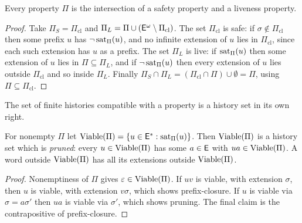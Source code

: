 \begin{established}[Decomposition]\label{thm:alpern-schneider}
Every property $\Pi$ is the intersection of a safety property and a liveness property.
\end{established}
\begin{proof}
Take $\Pi_S=\Pi_{\mathrm{cl}}$ and $\Pi_L=\Pi\cup(\mathsf{E}^{\omega}\setminus\Pi_{\mathrm{cl}})$. The set $\Pi_{\mathrm{cl}}$ is safe: if $\sigma\notin\Pi_{\mathrm{cl}}$ then some prefix $u$ has $\neg\operatorname{sat}_\Pi(u)$, and no infinite extension of $u$ lies in $\Pi_{\mathrm{cl}}$, since each such extension has $u$ as a prefix. The set $\Pi_L$ is live: if $\operatorname{sat}_\Pi(u)$ then some extension of $u$ lies in $\Pi\subseteq\Pi_L$, and if $\neg\operatorname{sat}_\Pi(u)$ then every extension of $u$ lies outside $\Pi_{\mathrm{cl}}$ and so inside $\Pi_L$. Finally $\Pi_S\cap\Pi_L=(\Pi_{\mathrm{cl}}\cap\Pi)\cup\emptyset=\Pi$, using $\Pi\subseteq\Pi_{\mathrm{cl}}$.
\end{proof}

The set of finite histories compatible with a property is a history set in its own right.

\begin{established}\label{prop:viable}
For nonempty $\Pi$ let $\operatorname{Viable}(\Pi)=\{u\in\mathsf{E}^{*}:\operatorname{sat}_\Pi(u)\}$. Then $\operatorname{Viable}(\Pi)$ is a history set which is \emph{pruned}: every $u\in\operatorname{Viable}(\Pi)$ has some $a\in\mathsf{E}$ with $ua\in\operatorname{Viable}(\Pi)$. A word outside $\operatorname{Viable}(\Pi)$ has all its extensions outside $\operatorname{Viable}(\Pi)$.
\end{established}
\begin{proof}
Nonemptiness of $\Pi$ gives $\varepsilon\in\operatorname{Viable}(\Pi)$. If $uv$ is viable, with extension $\sigma$, then $u$ is viable, with extension $v\sigma$, which shows prefix-closure. If $u$ is viable via $\sigma=a\sigma'$ then $ua$ is viable via $\sigma'$, which shows pruning. The final claim is the contrapositive of prefix-closure.
\end{proof}


